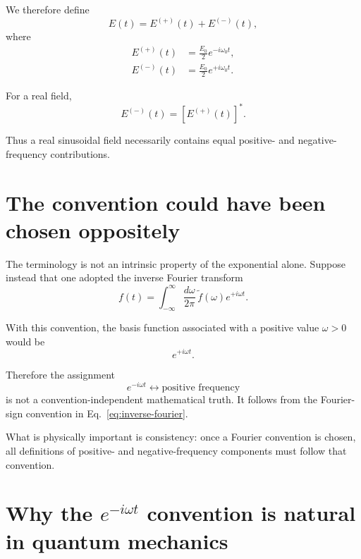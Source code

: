 \documentclass[11pt]{article}
\begin{document}
We therefore define
\begin{equation}
E(t)=E^{(+)}(t)+E^{(-)}(t),
\label{eq:E-decomposition}
\end{equation}
where
\begin{align}
E^{(+)}(t)
&=
\frac{E_0}{2}e^{-i\omega_0t},
\label{eq:E-positive}\\
E^{(-)}(t)
&=
\frac{E_0}{2}e^{+i\omega_0t}.
\label{eq:E-negative}
\end{align}

For a real field,
\begin{equation}
E^{(-)}(t)
=
\left[E^{(+)}(t)\right]^*.
\label{eq:conjugate-relation}
\end{equation}

Thus a real sinusoidal field necessarily contains equal positive- and negative-frequency contributions.

\section{The convention could have been chosen oppositely}

The terminology is not an intrinsic property of the exponential alone. Suppose instead that one adopted the inverse Fourier transform
\begin{equation}
f(t)
=
\int_{-\infty}^{\infty}
\frac{d\omega}{2\pi}\,
\widetilde f(\omega)e^{+i\omega t}.
\label{eq:opposite-convention}
\end{equation}

With this convention, the basis function associated with a positive value $\omega>0$ would be
\begin{equation}
e^{+i\omega t}.
\end{equation}

Therefore the assignment
\begin{equation}
e^{-i\omega t}
\longleftrightarrow
\text{positive frequency}
\end{equation}
is not a convention-independent mathematical truth. It follows from the Fourier-sign convention in Eq.~\eqref{eq:inverse-fourier}.

What is physically important is consistency: once a Fourier convention is chosen, all definitions of positive- and negative-frequency components must follow that convention.

\section{Why the $e^{-i\omega t}$ convention is natural in quantum mechanics}
\end{document}
